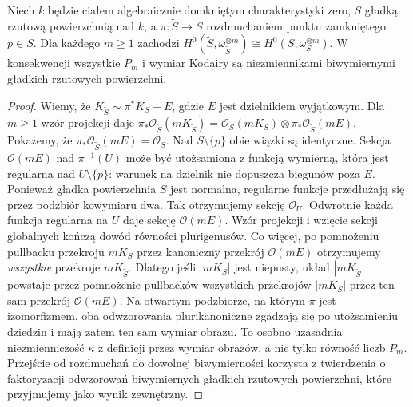 \begin{stwierdzenie}
\label{st:ga8-plurigenera-blowup}
Niech $k$ będzie ciałem algebraicznie domkniętym
charakterystyki zero, $S$ gładką rzutową powierzchnią
nad $k$, a $\pi:\widetilde S\to S$ rozdmuchaniem
punktu zamkniętego $p\in S$.
Dla każdego $m\ge1$ zachodzi
$H^0(\widetilde S,\omega_{\widetilde S}^{\otimes m})
\cong H^0(S,\omega_S^{\otimes m})$.
W konsekwencji wszystkie $P_m$ i wymiar Kodairy
są niezmiennikami biwymiernymi gładkich
rzutowych powierzchni.
\end{stwierdzenie}
\begin{proof}
Wiemy, że $K_{\widetilde S}\sim\pi^*K_S+E$,
gdzie $E$ jest dzielnikiem wyjątkowym. Dla $m\ge1$
wzór projekcji daje
$\pi_*\mathcal O_{\widetilde S}(mK_{\widetilde S})
=\mathcal O_S(mK_S)\otimes\pi_*\mathcal O_{\widetilde S}(mE)$.
Pokażemy, że $\pi_*\mathcal O_{\widetilde S}(mE)
=\mathcal O_S$. Nad $S\setminus\{p\}$ obie wiązki
są identyczne. Sekcja $\mathcal O(mE)$ nad
$\pi^{-1}(U)$ może być utożsamiona z funkcją wymierną,
która jest regularna nad $U\setminus\{p\}$:
warunek na dzielnik nie dopuszcza biegunów poza $E$.
Ponieważ gładka powierzchnia $S$ jest normalna,
regularne funkcje przedłużają się przez podzbiór
kowymiaru dwa. Tak otrzymujemy sekcję $\mathcal O_U$.
Odwrotnie każda funkcja regularna na $U$ daje
sekcję $\mathcal O(mE)$. Wzór projekcji i wzięcie
sekcji globalnych kończą dowód równości plurigenusów.
Co więcej, po pomnożeniu pullbacku przekroju $mK_S$
przez kanoniczny przekrój $\mathcal O(mE)$ otrzymujemy
\emph{wszystkie} przekroje $mK_{\widetilde S}$. Dlatego
jeśli $|mK_S|$ jest niepusty, układ $|mK_{\widetilde S}|$
powstaje przez pomnożenie pullbacków wszystkich przekrojów
$|mK_S|$ przez ten sam przekrój $\mathcal O(mE)$.
Na otwartym podzbiorze, na którym $\pi$ jest izomorfizmem,
oba odwzorowania plurikanoniczne zgadzają się po utożsamieniu
dziedzin i mają zatem ten sam wymiar obrazu.
To osobno uzasadnia niezmienniczość $\kappa$ z definicji
przez wymiar obrazów, a nie tylko równość liczb $P_m$.
Przejście od rozdmuchań do dowolnej biwymierności
korzysta z twierdzenia o faktoryzacji odwzorowań
biwymiernych gładkich rzutowych powierzchni,
które przyjmujemy jako wynik zewnętrzny.
\end{proof}

